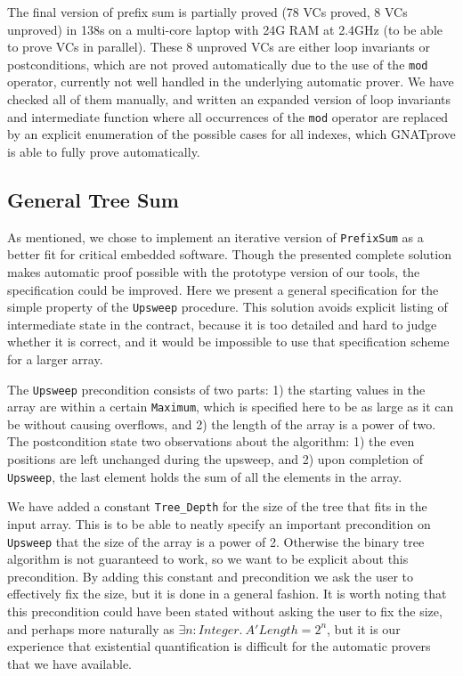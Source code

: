 \documentclass[sttt,final]{svjour}
\newcommand{\gnatprove}{GNATprove\xspace}
\begin{document}
The final version of prefix sum is partially proved (78 VCs proved, 8 VCs
%
%
unproved) in 138s on a multi-core laptop with 24G RAM at 2.4GHz (to
be able to prove VCs in parallel).  These 8 unproved VCs are either loop
invariants or postconditions, which are not proved automatically due to the use
of the \verb|mod| operator, currently not well handled in the underlying
automatic prover. We have checked all of them manually, and written an expanded
version of loop invariants and intermediate function where all occurrences of
the \verb|mod| operator are replaced by an explicit enumeration of the possible
cases for all indexes, which \gnatprove is able to fully prove automatically.

\subsection{General  Tree Sum}
As mentioned, we chose to implement an iterative version of
\verb|PrefixSum| as a better fit for critical embedded software.
Though the presented complete solution makes automatic
proof possible with the prototype version of our tools,
the specification could be improved. Here we present
a general specification for the simple property of the \verb|Upsweep|
procedure. This solution avoids explicit listing of intermediate state in the
contract, because it is too detailed and hard to judge whether it is
correct, and it would be impossible to use that specification scheme
for a larger array.

The \verb|Upsweep| precondition consists of two parts: 1) the starting
values in the array are within a certain \verb|Maximum|, which is
specified here to be as large as it can be without causing overflows,
and 2) the length of the array is a power of two. The postcondition
state two observations about the algorithm: 1) the even positions are
left unchanged during the upsweep, and 2) upon completion of
\verb|Upsweep|, the last element holds the sum of all the elements in
the array.

We have added a constant \verb|Tree_Depth| for the size of the tree
that fits in the input array. This is to be able to neatly specify an
important precondition on \verb|Upsweep| that the size of the array is
a power of 2. Otherwise the binary tree algorithm is not guaranteed to
work, so we want to be explicit about this precondition. By adding
this constant and precondition we ask the user to effectively fix the
size, but it is done in a general fashion. It is worth noting that
this precondition could have been stated without asking the user to fix
the size, and perhaps more naturally as $\exists n: \mathit{Integer}.~ A'\mathit{Length} = 2^n$, but it is our experience that existential quantification is
difficult for the automatic provers that we have available.
\end{document}
